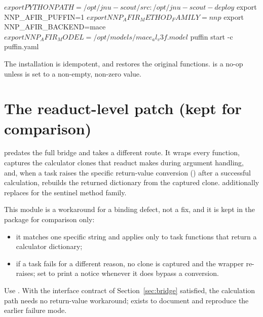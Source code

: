 \begin{transcript}
$ export PYTHONPATH=/opt/jnu-scout/src:/opt/jnu-scout-deploy
$ export NNP_AFIR_PUFFIN=1
$ export NNP_AFIR_METHOD_FAMILY=nnp
$ export NNP_AFIR_BACKEND=mace
$ export NNP_AFIR_MODEL=/opt/models/mace_al_v3f.model
$ puffin start -c puffin.yaml
\end{transcript}

The installation is idempotent, and  restores the
original functions.   is a no-op unless
 is set to a non-empty, non-zero value.

\section{The readuct-level patch (kept for comparison)}
\label{sec:readuct-patch}

 predates the full bridge and takes a
different route.  It wraps every  function, captures
the calculator clones that readuct makes during argument handling, and, when a
task raises the specific return-value conversion 
() after a successful calculation,
rebuilds the returned dictionary from the captured clone.
 additionally
replaces  for the sentinel method
family.

This module is a workaround for a binding defect, not a fix, and it is kept in
the package for comparison only:

\begin{itemize}
  \item it matches one specific  string and applies only to
        task functions that return a calculator dictionary;
  \item if a task fails for a different reason, no clone is captured and the
        wrapper re-raises; set  to print a notice
        whenever it does bypass a conversion.
\end{itemize}

\begin{notebox}
Use .  With the interface contract of
Section~\ref{sec:bridge} satisfied, the calculation path needs no return-value
workaround;  exists to document and reproduce the
earlier failure mode.
\end{notebox}

